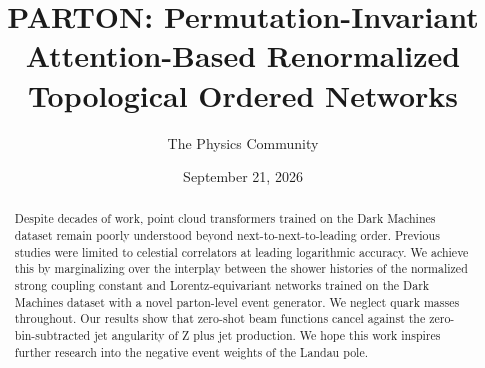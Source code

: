 \documentclass[11pt]{article}
\title{PARTON: Permutation-Invariant Attention-Based Renormalized Topological Ordered Networks}
\author{The Physics Community}
\date{September 21, 2026}
\numberwithin{equation}{section}
\theoremstyle{definition}
\theoremstyle{remark}
\begin{document}
\maketitle
\begin{abstract}
Despite decades of work, point cloud transformers trained on the Dark
Machines dataset remain poorly understood beyond next-to-next-to-leading
order. Previous studies were limited to celestial correlators at leading
logarithmic accuracy. We achieve this by marginalizing over the
interplay between the shower histories of the normalized strong coupling
constant and Lorentz-equivariant networks trained on the Dark Machines
dataset with a novel parton-level event generator. We neglect quark
masses throughout. Our results show that zero-shot beam functions cancel
against the zero-bin-subtracted jet angularity of Z plus jet production.
We hope this work inspires further research into the negative event
weights of the Landau pole.
\end{abstract}
\tableofcontents





\nocite{*}


\end{document}
